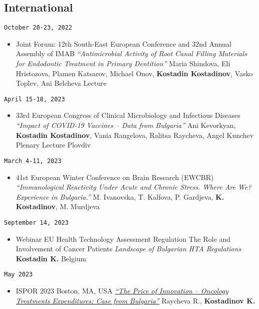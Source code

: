 \documentclass[
  12pt,
  letterpaper,
  DIV=11,
  numbers=noendperiod]{scrartcl}
\providecommand{\tightlist}{%
  \setlength{\itemsep}{0pt}\setlength{\parskip}{0pt}}\usepackage{longtable,booktabs,array}
\begin{document}
\subsection{International}\label{international-1}

\texttt{October\ 20-23,\ 2022}

\begin{itemize}
\tightlist
\item
  Joint Forum: 12th South-East European Conference and 32nd Annual
  Assembly of IMAB \textbar{} \emph{``Antimicrobial Activity of Root
  Canal Filling Materials for Endodontic Treatment in Primary
  Dentition''} \textbar{} Maria Shindova, Eli Hristozova, Plamen
  Katsarov, Michael Onov, \textbf{Kostadin Kostadinov}, Vasko Toplev,
  Ani Belcheva \textbar{} Lecture
\end{itemize}

\texttt{April\ 15-18,\ 2023}

\begin{itemize}
\tightlist
\item
  33rd European Congress of Clinical Microbiology and Infectious
  Diseases \textbar{} \emph{``Impact of COVID-19 Vaccines -- Data from
  Bulgaria''} \textbar{} Ani Kevorkyan, \textbf{Kostadin Kostadinov},
  Vania Rangelova, Ralitsa Raycheva, Angel Kunchev \textbar{} Plenary
  Lecture \textbar{} Plovdiv
\end{itemize}

\texttt{March\ 4-11,\ 2023}

\begin{itemize}
\tightlist
\item
  41st European Winter Conference on Brain Research (EWCBR) \textbar{}
  \emph{``Immunological Reactivity Under Acute and Chronic Stress. Where
  Are We? Experience in Bulgaria.''} \textbar{} M. Ivanovska, T.
  Kalfova, P. Gardjeva, \textbf{K. Kostadinov}, M. Murdjeva
\end{itemize}

\texttt{September\ 14,\ 2023}

\begin{itemize}
\tightlist
\item
  Webinar \textbar{} EU Health Technology Assessment Regulation
  \textbar{} The Role and Involvement of Cancer Patients \textbar{}
  \emph{Landscape of Bulgarian HTA Regulations} \textbar{}
  \textbf{Kostadin K.} \textbar{} Belgium
\end{itemize}

\texttt{May\ 2023}

\begin{itemize}
\tightlist
\item
  ISPOR 2023 \textbar{} Boston, MA, USA \textbar{}
  \emph{\href{https://www.ispor.org/heor-resources/presentations-database/presentation/intl2023-3665/126756}{``The
  Price of Innovation -- Oncology Treatments Expenditures: Case from
  Bulgaria''}} \textbar{} Raycheva R., \textbf{Kostadinov K.}
\end{itemize}
\end{document}
